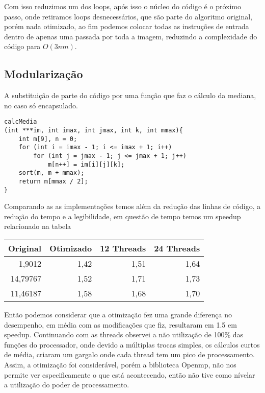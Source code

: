 \documentclass[10pt,journal,compsoc]{IEEEtran}
\begin{document}
Com isso reduzimos um dos loops, após isso o núcleo do código é o próximo passo, onde retiramos loops desnecessários, que são parte do algoritmo original, porém nada otimizado, ao fim podemos colocar todas as instruções de entrada dentro de apenas uma passada por toda a imagem, reduzindo a complexidade do código para $O(3nm)$.

\subsection{Modularização}
A substituição de parte do código por uma função que faz o cálculo da mediana, no caso só encapsulado.

\begin{verbatim}
calcMedia
(int ***im, int imax, int jmax, int k, int mmax){
    int m[9], n = 0;
    for (int i = imax - 1; i <= imax + 1; i++)
        for (int j = jmax - 1; j <= jmax + 1; j++)
            m[n++] = im[i][j][k];
    sort(m, m + mmax);
    return m[mmax / 2];
}
\end{verbatim}

Comparando as as implementações temos além da redução das linhas de código, a redução do tempo e a legibilidade, em questão de tempo temos um speedup relacionado na tabela %

\begin{table}[h]
\label{tab:speedup}
\centering
\begin{tabular}{r|r|r|r}
Original & Otimizado & 12 Threads & 24 Threads \\
\hline
1,9012      & 1,42  & 1,51  & 1,64 \\
14,79767    & 1,52  & 1,71  & 1,73 \\
11,46187    & 1,58  & 1,68  & 1,70
\end{tabular}
\end{table}

Então podemos considerar que a otimização fez uma grande diferença no desempenho, em média com as modificações que fiz, resultaram em 1.5 em speedup. Continuando com as threads observei a não utilização de 100\% das funções do processador, onde devido a múltiplas trocas simples, os cálculos curtos de média, criaram um gargalo onde cada thread tem um pico de processamento. Assim, a otimização foi considerável, porém a biblioteca Openmp, não nos permite ver especificamente o que está acontecendo, então não tive como nívelar a utilização do poder de processamento.
\end{document}
